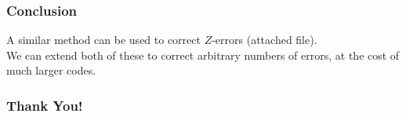 \documentclass[notheorems]{beamer}
\begin{document}
\begin{frame}
\frametitle{Conclusion}
A similar method can be used to correct $Z$-errors (attached file).\\ \pause
We can extend both of these to correct arbitrary numbers of errors, at the cost of much larger codes.
\end{frame}

\begin{frame}
\frametitle{Thank You!}

\nocite{*}
\printbibliography

\end{frame}
\end{document}
